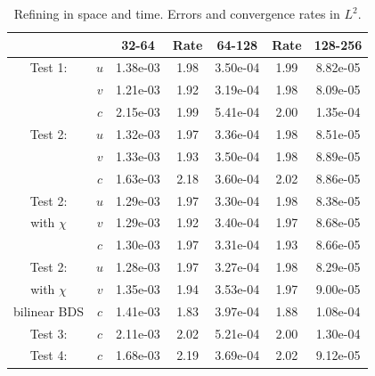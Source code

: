 \documentclass[final]{siamltex}
\begin{document}
\begin{table}[h]
\begin{center}
\caption{Refining in space and time.  Errors and convergence rates in $L^2$.}
\begin{tabular}{ccccccc}
& & 32-64 & Rate & 64-128 & Rate & 128-256 \\
\hline
Test 1:             & $u$ & 1.38e-03 & 1.98 & 3.50e-04 & 1.99 & 8.82e-05 \\
                    & $v$ & 1.21e-03 & 1.92 & 3.19e-04 & 1.98 & 8.09e-05 \\
                    & $c$ & 2.15e-03 & 1.99 & 5.41e-04 & 2.00 & 1.35e-04 \\
\hline
Test 2:             & $u$ & 1.32e-03 & 1.97 & 3.36e-04 & 1.98 & 8.51e-05 \\
                    & $v$ & 1.33e-03 & 1.93 & 3.50e-04 & 1.98 & 8.89e-05 \\
                    & $c$ & 1.63e-03 & 2.18 & 3.60e-04 & 2.02 & 8.86e-05 \\
\hline
Test 2:             & $u$ & 1.29e-03 & 1.97 & 3.30e-04 & 1.98 & 8.38e-05 \\
with $\chi$         & $v$ & 1.29e-03 & 1.92 & 3.40e-04 & 1.97 & 8.68e-05 \\
                    & $c$ & 1.30e-03 & 1.97 & 3.31e-04 & 1.93 & 8.66e-05 \\
\hline
Test 2:             & $u$ & 1.28e-03 & 1.97 & 3.27e-04 & 1.98 & 8.29e-05 \\
with $\chi$         & $v$ & 1.35e-03 & 1.94 & 3.53e-04 & 1.97 & 9.00e-05 \\
bilinear BDS        & $c$ & 1.41e-03 & 1.83 & 3.97e-04 & 1.88 & 1.08e-04 \\
\hline
Test 3:             & $c$ & 2.11e-03 & 2.02 & 5.21e-04 & 2.00 & 1.30e-04 \\
\hline
Test 4:             & $c$ & 1.68e-03 & 2.19 & 3.69e-04 & 2.02 & 9.12e-05
\end{tabular}
\end{center}
\end{table}
\end{document}
